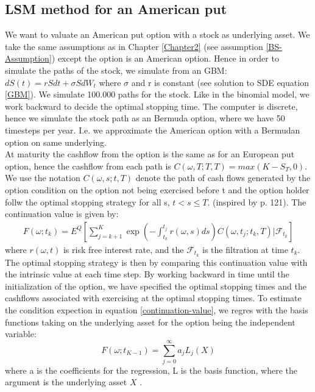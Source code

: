 \subsection{LSM method for an American put}           
We want to valuate an American put option with a stock as underlying asset. We take the same assumptions as in Chapter \ref{Chapter2} (see assumption \ref{BS-Assumption}) except the option is an American option. Hence in order to simulate the paths of the stock, we simulate from an GBM: $dS(t)=rSdt + \sigma S dW_t$ where $\sigma$ and r is constant (see solution to SDE equation \ref{GBM}). We simulate 100.000 paths for the stock. Like in the binomial model, we work backward to decide the optimal stopping time. The computer is discrete, hence we simulate the stock path as an Bermuda option, where we have 50 timesteps per year. I.e. we approximate the American option with a Bermudan option on same underlying. \\

At maturity the cashflow from the option is the same as for an European put option, hence the cashflow from each path is $C(\omega,T;T, T)=max(K-S_T,0)$. We use the notation $C(\omega, s; t, T)$ denote the path of cash flows generated by the option condition on the option not being exercised before t and the option holder follw the optimal stopping strategy for all s, $t<s\leq T$.
(inspired by \parencite{lsm} p. 121). The continuation value is given by:
\begin{equation}\label{continuation-value}
\begin{split}
F(\omega; t_k)=E^Q[\sum_{j=k+1}^K \exp(-\int_{t_k}^{t_j} r(\omega,s) ds)C(\omega,t_j; t_k, T)|\mathcal{F}_{t_k}]
\end{split}
\end{equation}
where $r(\omega,t)$ is risk free interest rate, and the $\mathcal{F}_{t_k}$ is the filtration at time $t_k$.\\

The optimal stopping strategy is then by comparing this continuation value with the intrinsic value at each time step. By working backward in time until the initialization of the option, we have specified the optimal stopping times and the cashflows associated with exercising at the optimal stopping times. To estimate the condition expection in equation \ref{continuation-value}, we regres with the basis functions taking on the underlying asset for the option being the independent variable:
$$F(\omega;t_{K-1})= \sum_{j=0}^\infty a_j L_j(X)$$
where a is the coefficients for the regression, L is the basis function, where the argument is the underlying asset $X$ \parencite{lsm}.

